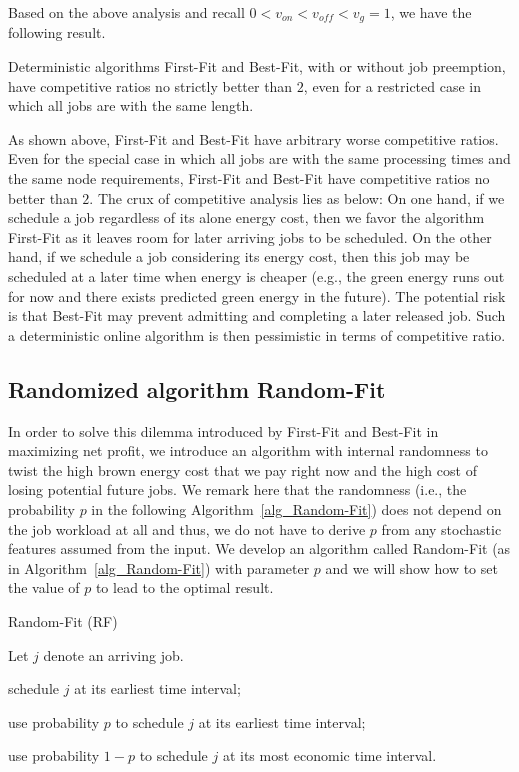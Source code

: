\documentclass[conference]{IEEEtran}
\begin{document}
Based on the above analysis and recall $0 < v_{on} < v_{off} < v_g = 1$, we have the following result.

\begin{corollary}
Deterministic algorithms First-Fit and Best-Fit, with or without job preemption, have competitive ratios no strictly better than $2$, even for a restricted case in which all jobs are with the same length.
\end{corollary}

As shown above, First-Fit and Best-Fit have arbitrary worse competitive ratios. Even for the special case in which all jobs are with the same processing times and the same node requirements, First-Fit and Best-Fit have competitive ratios no better than $2$. The crux of competitive analysis lies as below: On one hand, if we schedule a job regardless of its alone energy cost, then we favor the algorithm First-Fit as it leaves room for later arriving jobs to be scheduled. On the other hand, if we schedule a job considering its energy cost, then this job may be scheduled at a later time when energy is cheaper (e.g., the green energy runs out for now and there exists predicted green energy in the future). The potential risk is that Best-Fit may prevent admitting and completing a later released job. Such a deterministic online algorithm is then pessimistic in terms of competitive ratio.



\subsection{Randomized algorithm Random-Fit}
\label{alg:rf}

In order to solve this dilemma introduced by First-Fit and Best-Fit in maximizing net profit, we introduce an algorithm with internal randomness to twist the high brown energy cost that we pay right now and the high cost of losing potential future jobs. We remark here that the randomness (i.e., the probability $p$ in the following Algorithm~\ref{alg_Random-Fit}) does not depend on the job workload at all and thus, we do not have to derive $p$ from any stochastic features assumed from the input. We develop an algorithm called Random-Fit (as in Algorithm~\ref{alg_Random-Fit}) with parameter $p$ and we will show how to set the value of $p$ to lead to the optimal result.

\begin{algorithm}
\caption{Random-Fit (RF)}
\begin{algorithmic}[1]
\STATE Let $j$ denote an arriving job.


\STATE schedule $j$ at its earliest time interval;

\ELSE

\STATE use probability $p$ to schedule $j$ at its earliest time interval;

\STATE use probability $1 - p$ to schedule $j$ at its most economic time interval.

\ENDIF
\end{algorithmic}
\label{alg_Random-Fit}
\end{algorithm}
\end{document}
